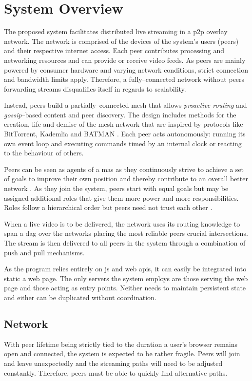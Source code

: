 \section{System Overview}

The proposed system facilitates distributed live streaming in a \gls{p2p} overlay network. The network is comprised of the devices of the system's users (peers) and their respective internet access. Each peer contributes processing and networking resources and can provide or receive video feeds. As peers are mainly powered by consumer hardware and varying network conditions, strict connection and bandwidth limits apply. Therefore, a fully–connected network without peers forwarding streams disqualifies itself in regards to scalability.

Instead, peers build a partially–connected mesh that allows \textit{proactive routing} and \textit{gossip}–based content and peer discovery. The design includes methods for the creation, life and demise of the mesh network that are inspired by protocols like BitTorrent, Kademlia and BATMAN \cite{TODO}. Each peer acts autonomously: running its own event loop and executing commands timed by an internal clock or reacting to the behaviour of others.

Peers can be seen as agents of a \gls{mas} \cite{TODO-multiagent} as they continuously strive to achieve a set of goals to improve their own position and thereby contribute to an overall better network \cite{convergance}.
As they join the system, peers start with equal goals but may be assigned additional roles that give them more power and more responsibilities. Roles follow a hierarchical order but peers need not trust each other \cite{hmmmm-TODO}.

When a live video is to be delivered, the network uses its routing knowledge to span a \gls{dag} over the networks placing the most reliable peers crucial intersections. The stream is then delivered to all peers in the system through a combination of push and pull mechanisms.

As the program relies entirely on \gls{js} and web \glspl{api}, it can easily be integrated into static a web page. The only servers the system employs are those serving the web page and those acting as entry points. Neither needs to maintain persistent state and either can be duplicated without coordination.

\subsection{Network}
With peer lifetime being strictly tied to the duration a user's browser remains open and connected, the system is expected to be rather fragile. Peers will join and leave unexpectedly and the streaming paths will need to be adjusted constantly. Therefore, peers must be able to quickly find alternative paths.

